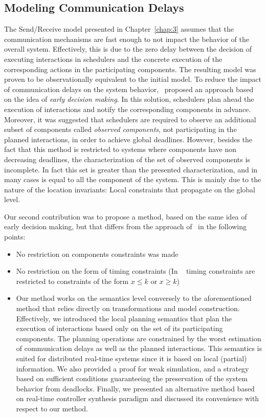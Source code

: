 \subsection*{Modeling Communication Delays}
The Send/Receive model presented in Chapter~\ref{chap:3} assumes that the communication 
mechanisms are fast enough to not impact the behavior of the overall system. Effectively, this
is due to the zero delay between the decision of executing interactions in schedulers and
the concrete execution of the corresponding actions in the participating components.
The resulting model was proven to be observationally equivalent to the initial model.
To reduce the impact of communication delays on the system behavior,~\cite{ahlem_these} proposed
an approach based on the idea of \emph{early decision making}. In this solution, schedulers
plan ahead the execution of interactions and notify the corresponding components in advance.
Moreover, it was suggested that schedulers are required to observe an additional subset of
components called \emph{observed components}, not participating in the planned interactions, 
in order to achieve global deadlines.
However, besides the fact that this method is restricted to systems where components have non 
decreasing deadlines, the characterization of the set of observed components is incomplete. In 
fact this set is greater than the presented characterization, and in many cases is equal to 
all the component of the system. This is mainly due to the nature of the location invariants:
Local constraints that propagate on the global level.

Our second contribution was to propose a method, based on the same idea of early decision making,
but that differs from the approach of~\cite{ahlem_these} in the following points:
\begin{itemize}
  \item No restriction on components constraints was made
  \item No restriction on the form of timing constraints (In ~\cite{ahlem_these} timing 
    constraints are restricted to constraints of the form $x\le k$ or $x\ge k$)
  \item Our method works on the semantics level conversely to the aforementioned method that
    relies directly on transformations and model construction. Effectively, we introduced 
    the local planning semantics that plan the execution of interactions based only on 
    the set of its participating components. The planning operations are constrained by 
    the worst estimation of communication delays as well as the planned interactions. This
    semantics is suited for distributed real-time systems since it is based on local (partial)
    information. We also provided a proof for weak simulation, and a strategy based on 
    sufficient conditions guaranteeing the preservation of the system behavior from deadlocks. 
    Finally, we presented an alternative method based on real-time controller synthesis 
    paradigm and discussed its convenience with respect to our method. 
\end{itemize}

